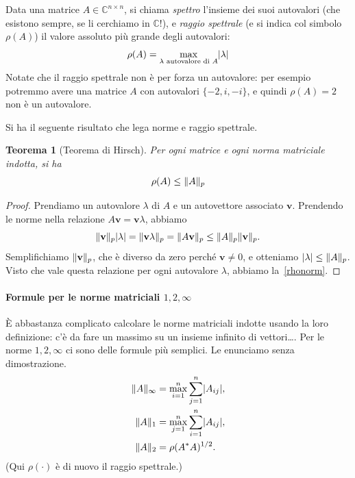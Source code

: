 \documentclass[a4paper]{report}
\DeclarePairedDelimiter{\abs}{\lvert}{\rvert}
\DeclarePairedDelimiter{\norm}{\lVert}{\rVert}
\newtheorem{theorem}{Teorema}[chapter]
\theoremstyle{definition}
\theoremstyle{remark}
\begin{document}
Data una matrice $A \in \mathbb{C}^{n\times n}$, si chiama \emph{spettro} l'insieme dei suoi autovalori (che esistono sempre, se li cerchiamo in $\mathbb{C}$!), e \emph{raggio spettrale} (e si indica col simbolo $\rho(A)$) il valore assoluto più grande degli autovalori:
\[
\rho(A) = \max_{\text{$\lambda$ autovalore di $A$}} \abs{\lambda}
\]
Notate che il raggio spettrale non è per forza un autovalore: per esempio potremmo avere una matrice $A$ con autovalori $\{-2, i, -i\}$, e quindi $\rho(A)=2$ non è un autovalore.

Si ha il seguente risultato che lega norme e raggio spettrale.
\begin{theorem}[Teorema di Hirsch]
    Per ogni matrice e ogni norma matriciale indotta, si ha
\begin{equation} \label{rhonorm}
    \rho(A) \leq \norm{A}_p    
\end{equation}
\end{theorem}
\begin{proof}
Prendiamo un autovalore $\lambda$ di $A$ e un autovettore associato $\mathbf{v}$. Prendendo le norme nella relazione $A\mathbf{v} = \mathbf{v}\lambda$, abbiamo
\[
\norm{\mathbf{v}}_p \abs{\lambda} = \norm{\mathbf{v}\lambda}_p = \norm{A\mathbf{v}}_p \leq \norm{A}_p \norm{\mathbf{v}}_p.
\]
Semplifichiamo $\norm{\mathbf{v}}_p$, che è diverso da zero perché $\mathbf{v}\neq 0$, e otteniamo $\abs{\lambda} \leq \norm{A}_p$. Visto che vale questa relazione per ogni autovalore $\lambda$, abbiamo la~\eqref{rhonorm}.
\end{proof}

\paragraph{Formule per le norme matriciali $1,2,\infty$}
È abbastanza complicato calcolare le norme matriciali indotte usando la loro definizione: c'è da fare un massimo su un insieme infinito di vettori\dots. Per le norme $1,2,\infty$ ci sono delle formule più semplici. Le enunciamo senza dimostrazione.
\begin{align*}
\norm{A}_{\infty} &= \max_{i=1}^n \sum_{j=1}^n \abs{A_{ij}},\\
\norm{A}_{1} &= \max_{j=1}^n \sum_{i=1}^n \abs{A_{ij}},\\
\norm{A}_2 &= \rho(A^*A)^{1/2}.
\end{align*}
(Qui $\rho(\cdot)$ è di nuovo il raggio spettrale.)
\end{document}
